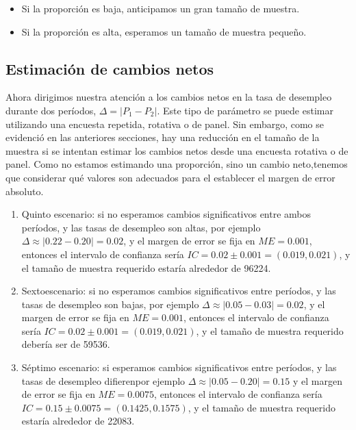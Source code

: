 \documentclass[
  12pt,
  spanish,
]{book}
\providecommand{\tightlist}{%
  \setlength{\itemsep}{0pt}\setlength{\parskip}{0pt}}
\begin{document}
\begin{itemize}
\tightlist
\item
  Si la proporción es baja, anticipamos un gran tamaño de muestra.
\item
  Si la proporción es alta, esperamos un tamaño de muestra pequeño.
\end{itemize}

\hypertarget{estimaciuxf3n-de-cambios-netos}{%
\subsection{Estimación de cambios netos}\label{estimaciuxf3n-de-cambios-netos}}

Ahora dirigimos nuestra atención a los cambios netos en la tasa de desempleo durante dos períodos, \(\Delta= |P_{1}-P_{2}|\). Este tipo de parámetro se puede estimar utilizando una encuesta repetida, rotativa o de panel. Sin embargo, como se evidenció en las anteriores secciones, hay una reducción en el tamaño de la muestra si se intentan estimar los cambios netos desde una encuesta rotativa o de panel. Como no estamos estimando una proporción, sino un cambio neto,tenemos que considerar qué valores son adecuados para el establecer el margen de error absoluto.

\begin{enumerate}
\def\labelenumi{\arabic{enumi}.}
\setcounter{enumi}{4}
\item
  Quinto escenario: si no esperamos cambios significativos entre ambos períodos, y las tasas de desempleo son altas, por ejemplo \(\Delta \approx |0.22-0.20|=0.02\), y el margen de error se fija en \(ME = 0.001\), entonces el intervalo de confianza sería \(IC=0.02 \pm 0.001=(0.019,0.021)\), y el tamaño de muestra requerido estaría alrededor de 96224.
\item
  Sextoescenario: si no esperamos cambios significativos entre períodos, y las tasas de desempleo son bajas, por ejemplo \(\Delta \approx |0.05-0.03| =0.02\), y el margen de error se fija en \(ME = 0.001\), entonces el intervalo de confianza sería \(IC=0.02\pm0.001=(0.019,0.021)\), y el tamaño de muestra requerido debería ser de 59536.
\item
  Séptimo escenario: si esperamos cambios significativos entre períodos, y las tasas de desempleo difierenpor ejemplo \(\Delta \approx|0.05-0.20|=0.15\) y el margen de error se fija en \(ME = 0.0075\), entonces el intervalo de confianza sería \(IC=0.15\pm0.0075=(0.1425,0.1575)\), y el tamaño de muestra requerido estaría alrededor de 22083.
\end{enumerate}
\end{document}
